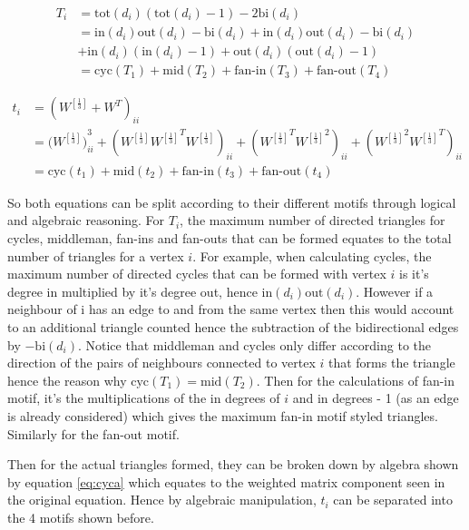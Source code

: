 \begin{align}
T_i &= \text{tot}(d_i)(\text{tot}(d_i) - 1) - 2\text{bi}(d_i) \\
&= \text{in}(d_i)\text{out}(d_i) - \text{bi}(d_i) + \text{in}(d_i)\text{out}(d_i) - \text{bi}(d_i) \nonumber \\
&+ \text{in}(d_i)(\text{in}(d_i) - 1) + \text{out}(d_i)(\text{out}(d_i) - 1) \nonumber \\ 
&= \text{cyc}(T_1) + \text{mid}(T_2) + \text{fan-in}(T_3) + \text{fan-out}(T_4) \nonumber
\end{align}

\begin{align}
t_i &= (W^{[\frac{1}{3}]} + W^T)_{ii} \\
&= ({W^{[\frac{1}{3}]})}^3_{ii} + (W^{[\frac{1}{3}]}{W^{[\frac{1}{3}]}}^TW^{[\frac{1}{3}]})_{ii} + ({W^{[\frac{1}{3}]}}^T{W^{[\frac{1}{3}]}}^2)_{ii} + ({W^{[\frac{1}{3}]}}^2{W^{[\frac{1}{3}]}}^T)_{ii} \nonumber \\ 
&= \text{cyc}(t_1) + \text{mid}(t_2) + \text{fan-in}(t_3) + \text{fan-out}(t_4) \nonumber
\end{align}
 
So both equations can be split according to their different motifs through logical and algebraic reasoning. For $T_i$, the maximum number of directed triangles for cycles, middleman, fan-ins and fan-outs that can be formed equates to the total number of triangles for a vertex $i$. For example, when calculating cycles, the maximum number of directed cycles that can be formed with vertex $i$ is it's degree in multiplied by it's degree out, hence $\text{in}(d_i)\text{out}(d_i)$. However if a neighbour of i has an edge to and from the same vertex then this would account to an additional triangle counted hence the subtraction of the bidirectional edges by $- \text{bi}(d_i)$. Notice that middleman and cycles only differ according to the direction of the pairs of neighbours connected to vertex $i$ that forms the triangle hence the reason why $\text{cyc}(T_1) = \text{mid}(T_2)$. Then for the calculations of fan-in motif, it's the multiplications of the in degrees of $i$ and in degrees - 1 (as an edge is already considered) which gives the maximum fan-in motif styled triangles. Similarly for the fan-out motif.

Then for the actual triangles formed, they can be broken down by algebra shown by equation \ref{eq:cyca} which equates to the weighted matrix component seen in the original equation. Hence by algebraic manipulation, $t_i$ can be separated into the 4 motifs shown before.

